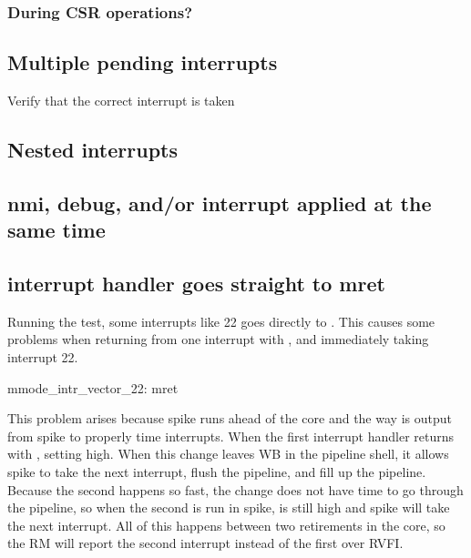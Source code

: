 \subsubsection{During CSR operations?}

\subsection{Multiple pending interrupts}

Verify that the correct interrupt is taken

\subsection{Nested interrupts}

\subsection{nmi, debug, and/or interrupt applied at the same time}

\subsection{interrupt handler goes straight to mret}

Running the  test, some interrupts like 22 goes directly to . This causes some problems when returning from one interrupt with , and immediately taking interrupt 22.

\begin{terminal}
mmode_intr_vector_22:
                  mret
\end{terminal}

This problem arises because spike runs ahead of the core and the way  is output from spike to properly time interrupts. When the first interrupt handler returns with , setting  high. When this change leaves WB in the pipeline shell, it allows spike to take the next interrupt, flush the pipeline, and fill up the pipeline. Because the second  happens so fast, the  change does not have time to go through the pipeline, so when the second  is run in spike,  is still high and spike will take the next interrupt. All of this happens between two retirements in the core, so the RM will report the second interrupt instead of the first over RVFI.

